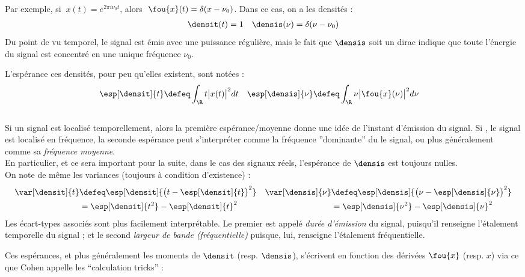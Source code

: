Par exemple, si $\ x(t)=e^{2\pi i\nu_0 t}$, alors $\ \fou{x}(t) = \delta(x-\nu_0)$. Dans ce cas, on a les densités :
\begin{align*}
	\densit(t) &= 1  &  \densis(\nu) = \delta(\nu-\nu_0)
\end{align*}
Du point de vu temporel, le signal est émis avec une puissance régulière, mais le fait que $\densis$ soit un dirac indique que toute l'énergie du signal est concentré en une unique fréquence $\nu_0$.


\begin{definition}\label{def:band-width}
	L'espérance ces densités, pour peu qu'elles existent, sont notées :
	\begin{align*}
		\esp[\densit]{t} &\defeq \int_\R t \big|x(t)\big|^2 dt   &  \esp[\densis]{\nu} &\defeq \int_\R \nu \big|\fou{x}(\nu)\big|^2 d\nu
	\end{align*}
	\\
	Si un signal est localisé temporellement, alors la première espérance/moyenne donne une idée de l'instant d'émission du signal. Si \acontrario, le signal est localisé en fréquence, la seconde espérance peut s'interpréter comme la fréquence ''dominante'' du le signal, ou plus généralement comme sa \emph{fréquence moyenne}. \\
	En particulier, et ce sera important pour la suite, dans le cas des signaux réels, l'espérance de $\densis$ est toujours nulles.
	\\
	On note de même les variances (toujours à condition d'existence) :
	\begin{align*}
		\var[\densit]{t} &\defeq \esp[\densit]{\big(t-\esp[\densit]{t}\big)^2}  &  \var[\densis]{\nu} &\defeq \esp[\densis]{\big(\nu - \esp[\densis]{\nu}\big)^2}\\
		& = \esp[\densit]{t^2} - \esp[\densit]{t}^2  &  &= \esp[\densis]{\nu^2} - \esp[\densis]{\nu}^2
	\end{align*}
	Les écart-types associés sont plus facilement interprétable. Le premier est appelé \emph{durée d'émission} du signal, puisqu'il renseigne l'étalement temporelle du signal ; et le second \emph{largeur de bande (fréquentielle)} puisque, lui, renseigne l'étalement fréquentielle. 
\end{definition}

Ces espérances, et plus généralement les moments de $\densit$ (resp. $\densis$), s'écrivent en fonction des dérivées $\fou{x}$ (resp. $x$) via ce que Cohen appelle les ``calculation tricks'' :

